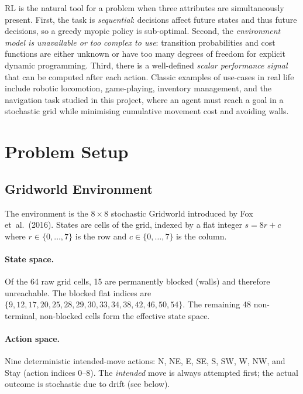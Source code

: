 \documentclass[11pt]{article}
\begin{document}
RL is the natural tool for a problem when three attributes are simultaneously
present.  First, the task is \emph{sequential}: decisions affect future states
and thus future decisions, so a greedy myopic policy is sub-optimal.  Second,
the \emph{environment model is unavailable or too complex to use}: transition
probabilities and cost functions are either unknown or have too many degrees
of freedom for explicit dynamic programming.  Third, there is a well-defined
\emph{scalar performance signal} that can be computed after each action.
Classic examples of use-cases in real life include robotic locomotion,
game-playing, inventory management, and the navigation task studied in this
project, where an agent must reach a goal in a stochastic grid while minimising
cumulative movement cost and avoiding walls.

\section{Problem Setup}

\subsection{Gridworld Environment}

The environment is the $8 \times 8$ stochastic Gridworld introduced by Fox
et~al.~(2016).  States are cells of the grid, indexed by a flat integer
$s = 8r + c$ where $r \in \{0,\ldots,7\}$ is the row and $c \in \{0,\ldots,7\}$
is the column.

\paragraph{State space.}
Of the 64 raw grid cells, 15 are permanently blocked (walls) and therefore
unreachable.  The blocked flat indices are $\{9, 12, 17, 20, 25, 28, 29, 30,
33, 34, 38, 42, 46, 50, 54\}$.  The remaining 48 non-terminal, non-blocked
cells form the effective state space.

\paragraph{Action space.}
Nine deterministic intended-move actions: N, NE, E, SE, S, SW, W, NW, and
Stay (action indices 0--8).  The \emph{intended} move is always attempted
first; the actual outcome is stochastic due to drift (see below).
\end{document}
